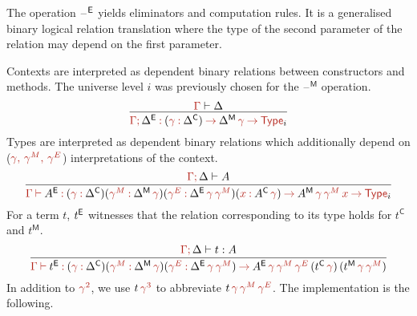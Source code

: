 \documentclass[a4paper,UKenglish]{lipics-v2018}
\newcommand{\ra}{\rightarrow}
\newcommand{\blank}{\mathord{\hspace{1pt}\text{--}\hspace{1pt}}} %
\newcommand{\C}{\mathsf{C}}
\newcommand{\M}{\mathsf{M}}
\newcommand{\1}{\mathsf{1}} \renewcommand{\Pr}{\mathsf{Pr}}
\renewcommand{\in}{\mathbin{\hat:}}
\renewcommand{\hat}[1]{{\color{BrickRed}{#1}}}
\newcommand{\vdashh}{\mathbin{\hat\vdash}}
\newcommand{\rah}{\mathbin{\hat\ra}}
\newcommand{\commah}{\hat,\,}
\newcommand{\Type}{\hat{\mathsf{Type}}}
\newcommand{\semicol}{\hat;\,}
\begin{document}
The operation $\blank^\E$ yields eliminators and computation rules. It
is a generalised binary logical relation translation where the type of
the second parameter of the relation may depend on the first
parameter.

Contexts are interpreted as dependent binary relations between
constructors and methods. The universe level $i$ was previously chosen
for the $\blank^\M$ operation.
\[
\infer{\hat{\Gamma}\semicol\Delta^\E \in (\hat{\gamma}\in\Delta^\C)\rah \Delta^\M\,\hat{\gamma}\rah \Type_{i}}{\hat{\Gamma}\vdash\Delta}
\]
Types are interpreted as dependent binary relations which additionally
depend on ($\hat{\gamma}\commah\,\hat{\gamma^M}\commah\,\hat{\gamma^E}$) interpretations of the
context.
\[
\infer{\hat{\Gamma}\vdashh A^\E \in (\hat{\gamma}\in\Delta^\C)(\hat{\gamma^M}\in\Delta^\M\,\hat{\gamma})(\hat{\gamma^E}\in\Delta^\E\,\hat{\gamma}\,\hat{\gamma^M})(\hat{x}\in A^\C\,\hat{\gamma})\rah  A^\M\,\hat{\gamma}\,\hat{\gamma^M}\,\hat{x}\rah \Type_{i}}{\hat{\Gamma}\semicol\Delta\vdash A}
\]
For a term $t$, $t^{\mathsf{E}}$ witnesses that the relation corresponding to
its type holds for $t^\C$ and $t^\M$.
\[
\infer{\hat{\Gamma}\vdashh t^\E \in (\hat{\gamma}\in\Delta^\C)(\hat{\gamma^M}\in\Delta^\M\,\hat{\gamma})(\hat{\gamma^E}\in\Delta^\E\,\hat{\gamma}\,\hat{\gamma^M})\rah  A^\E\,\hat{\gamma}\,\hat{\gamma^M}\,\hat{\gamma^E}\,(t^\C\,\hat{\gamma})\,(t^\M\,\hat{\gamma}\,\hat{\gamma^M})}{\hat{\Gamma}\semicol\Delta \vdash t : A}
\]
In addition to $\hat{\gamma^2}$, we use $t\,\hat{\gamma^3}$ to abbreviate $t\,\hat{\gamma}\,\hat{\gamma^M}\,\hat{\gamma^E}$. The implementation is the following.
\end{document}

